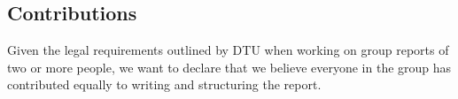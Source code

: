 \subsection{Contributions}
Given the legal requirements outlined by DTU when working on group reports of two or more people, we want to declare that we believe everyone in the group has contributed equally to writing and structuring the report. 